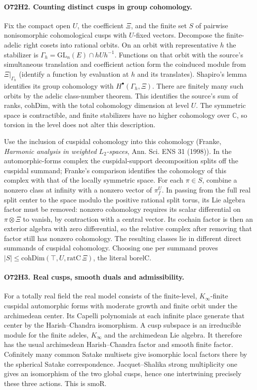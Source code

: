 \paragraph{O72H2. Counting distinct cusps in group cohomology.}
Fix the compact open $U$, the coefficient $\Xi$, and the finite
set $S$ of pairwise nonisomorphic cohomological cusps with
$U$-fixed vectors. Decompose the finite-adelic right cosets into
rational orbits. On an orbit with representative $h$ the stabilizer
is $\Gamma_h=\mathrm{GL}_n(E)\cap hUh^{-1}$. Functions on that
orbit with the source's simultaneous translation and coefficient
action form the coinduced module from $\Xi|_{\Gamma_h}$
(identify a function by evaluation at $h$ and its translates).
Shapiro's lemma identifies its group cohomology with
$H^\bullet(\Gamma_h,\Xi)$. There are finitely many such orbits
by the adelic class-number theorem. This identifies the source's
sum of ranks, $\mathrm{cohDim}$, with the total cohomology dimension
at level $U$. The symmetric space is contractible, and finite
stabilizers have no higher cohomology over $\mathbb C$, so torsion
in the level does not alter this description.

Use the inclusion of cuspidal cohomology into this cohomology
(Franke, \emph{Harmonic analysis in weighted $L_2$-spaces},
Ann. Sci. ENS 31 (1998)). In the automorphic-forms complex the
cuspidal-support decomposition splits off the cuspidal summand;
Franke's comparison identifies the cohomology of this complex
with that of the locally symmetric space. For each $\pi\in S$,
combine a nonzero class at infinity with a nonzero vector of
$\pi_f^U$. In passing from the full real split center to the
space modulo the positive rational split torus, its Lie algebra
factor must be removed: nonzero cohomology requires its scalar
differential on $\pi\otimes\Xi$ to vanish, by contraction with a
central vector. Its cochain factor is then an exterior algebra with
zero differential, so the relative complex after removing that
factor still has nonzero cohomology. The resulting classes lie in
different direct summands of cuspidal cohomology. Choosing one per
summand proves $|S|\le\mathrm{cohDim}(\top,U,\mathrm{ratC}\,\Xi)$,
the literal $\mathrm{borelC}$.

\paragraph{O72H3. Real cusps, smooth duals and admissibility.}
For a totally real field the real model consists of the finite-level,
$K_\infty$-finite cuspidal automorphic forms with moderate growth and
finite orbit under the archimedean center. Its Capelli polynomials at
each infinite place generate that center by the Harish--Chandra
isomorphism. A cusp subspace is an irreducible module for the finite
adeles, $K_\infty$ and the archimedean Lie algebra. It therefore has
the usual archimedean Harish--Chandra factor and smooth finite factor.
Cofinitely many common Satake multisets give isomorphic local factors
there by the spherical Satake correspondence. Jacquet--Shalika strong
multiplicity one gives an isomorphism of the two global cusps, hence
one intertwining precisely these three actions. This is
$\mathrm{smoR}$.

